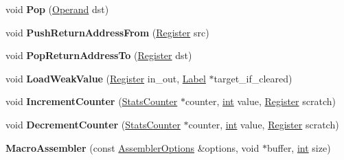 \begin{DoxyCompactItemize}
\item 
\mbox{\label{classv8_1_1internal_1_1MacroAssembler_a2e774e97d85d1f780035458e49748758}} 
void {\bfseries Pop} (\mbox{\hyperlink{classv8_1_1internal_1_1Operand}{Operand}} dst)
\item 
\mbox{\label{classv8_1_1internal_1_1MacroAssembler_ac4a545c6303201775f10cfac5e36040b}} 
void {\bfseries Push\+Return\+Address\+From} (\mbox{\hyperlink{classv8_1_1internal_1_1Register}{Register}} src)
\item 
\mbox{\label{classv8_1_1internal_1_1MacroAssembler_af5f4465c77b713f570aae4ce0dc9beb7}} 
void {\bfseries Pop\+Return\+Address\+To} (\mbox{\hyperlink{classv8_1_1internal_1_1Register}{Register}} dst)
\item 
\mbox{\label{classv8_1_1internal_1_1MacroAssembler_a53a974c36de33ea90f1f1f0b69c5d465}} 
void {\bfseries Load\+Weak\+Value} (\mbox{\hyperlink{classv8_1_1internal_1_1Register}{Register}} in\+\_\+out, \mbox{\hyperlink{classv8_1_1internal_1_1Label}{Label}} $\ast$target\+\_\+if\+\_\+cleared)
\item 
\mbox{\label{classv8_1_1internal_1_1MacroAssembler_aaa19705643eb93bb057fb19336a34ee9}} 
void {\bfseries Increment\+Counter} (\mbox{\hyperlink{classv8_1_1internal_1_1StatsCounter}{Stats\+Counter}} $\ast$counter, \mbox{\hyperlink{classint}{int}} value, \mbox{\hyperlink{classv8_1_1internal_1_1Register}{Register}} scratch)
\item 
\mbox{\label{classv8_1_1internal_1_1MacroAssembler_aa24286a554cd80c47f14ac62d45de433}} 
void {\bfseries Decrement\+Counter} (\mbox{\hyperlink{classv8_1_1internal_1_1StatsCounter}{Stats\+Counter}} $\ast$counter, \mbox{\hyperlink{classint}{int}} value, \mbox{\hyperlink{classv8_1_1internal_1_1Register}{Register}} scratch)
\item 
\mbox{\label{classv8_1_1internal_1_1MacroAssembler_ab454c229ecab5061af905b7d5959c919}} 
{\bfseries Macro\+Assembler} (const \mbox{\hyperlink{structv8_1_1internal_1_1AssemblerOptions}{Assembler\+Options}} \&options, void $\ast$buffer, \mbox{\hyperlink{classint}{int}} size)

\end{DoxyCompactItemize}
